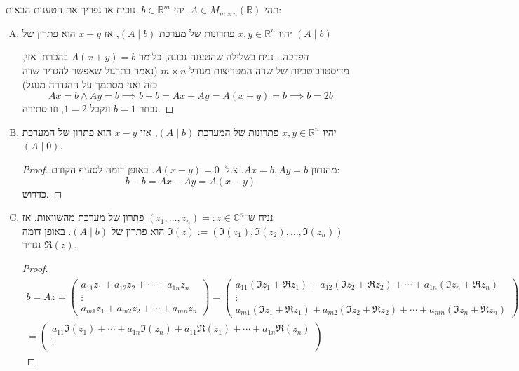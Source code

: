 \documentclass[]{article}
\newcommand\R     {\mathbb{R}}
\newcommand\C     {\mathbb{C}}
\newcommand\mat[2]    {M_{#1\times#2}}
\begin{document}
	\section{}
	תהי $A \in \mat{m}{n}(\R)$. יהי $b \in \R^m$. נוכיח או נפריך את הטענות הבאות: 
	\begin{enumerate}[A.]
		\item יהיו $x, y \in \R^n$ פתרונות של מערכת $(A \mid b)$, אז $x + y$ הוא פתרון של $(A \mid b)$
		\begin{proof}[הפרכה.]נניח בשלילה שהטענה נכונה, כלומר $A(x + y) = b$ בהכרח. אזי, מדיסטרבוטביות של שדה המטריצות מגודל $m \times n$ (נאמר בתרגול שאפשר להגדיר שדה כזה ואני מסתמך על ההגדרה מגוגל)
			\[ Ax = b \land Ay = b \implies b + b = Ax + Ay = A(x + y) = b \implies b = 2b \]
			נבחר $b = 1$ ונקבל $1 = 2$, וזו סתירה. 
		\end{proof}
		\item יהיו $x, y \in \R^n$ פתרונות של המערכת $(A \mid b)$, אזי $x - y$ הוא פתרון של המערכת $(A \mid 0)$. 
		\begin{proof}
			מהנתון $Ax = b, Ay = b$. צ.ל. $A(x - y) = 0$. באופן דומה לסעיף הקודם: 
			\[ b - b = Ax - Ay = A(x - y) \]
			כדרוש. 
		\end{proof}
		\item נניח ש־$(z_1, \dots, z_n) =: z \in \C^n$ פתרון של מערכת מהשוואות. אז $\Im(z) := (\Im(z_1), \Im(z_2), \dots, \Im(z_n))$ הוא פתרון של $(A \mid b)$. באופן דומה נגדיר $\Re(z)$. 
		\begin{proof}
			\begin{gather*}
				b = Az = \begin{pmatrix}
					a_{11}z_1 + a_{12}z_2 + \cdots + a_{1n}z_n \\
					\vdots \\
					a_{m1}z_1 + a_{m2}z_2 + \cdots + a_{mn}z_n
				\end{pmatrix} = \begin{pmatrix}
					a_{11}(\Im z_1 + \Re z_1) + a_{12}(\Im z_2 + \Re z_2) + \cdots + a_{1n}(\Im z_n + \Re z_n) \\
					\vdots \\
					a_{m1}(\Im z_1 + \Re z_1) + a_{m2}(\Im z_2 + \Re z_2) + \cdots + a_{mn}(\Im z_n + \Re z_n)
				\end{pmatrix} \\
				=\begin{pmatrix}
					a_{11}\Im(z_1) + \cdots + a_{1n}\Im(z_n) + a_{11}\Re(z_1) + \cdots + a_{1n}\Re(z_n) \\
					\vdots \\

\end{pmatrix}
\end{gather*}
\end{proof}
\end{enumerate}
\end{document}
